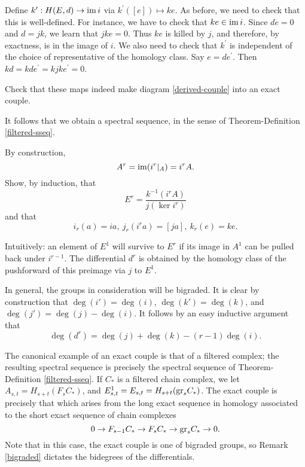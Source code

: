 Define $k^\prime:H(E,d) \to \operatorname{im} i$ via $k^\prime([e])\mapsto ke$. As before,
we need to check that this is well-defined. For instance, we have to check that
$ke\in\operatorname{im} i$. Since $de = 0$ and $d = jk$, we learn that $jke = 0$. Thus $ke$
is killed by $j$, and therefore, by exactness, is in the image of $i$. We also
need to check that $k^\prime$ is independent of the choice of representative of
the homology class. Say $e = de^\prime$. Then $kd = kd e^\prime = kjke^\prime =
0$.
\begin{exercise}
    Check that these maps indeed make diagram \eqref{derived-couple} into an
    exact couple.
\end{exercise}
It follows that we obtain a spectral sequence, in the sense of
Theorem-Definition \ref{filtered-sseq}.
\begin{exercise}\label{explicit-er}
    By construction,
    $$A^r = \operatorname{im}(i^{r}|_{A}) = i^{r} A.$$
    Show, by induction, that
    $$E^r = \frac{k^{-1}(i^{r}A)}{j(\ker i^{r})}$$
    and that
    \begin{equation*}
	i_r(a) = ia,\ j_r(i^r a) = [ja],\ k_r(e) = ke.
    \end{equation*}
\end{exercise}
Intuitively: an element of $E^1$ will survive to $E^r$ if its image in $A^1$
can be pulled back under $i^{r-1}$. The differential $d^r$ is obtained by
the homology class of the pushforward of this preimage via $j$ to $E^1$.
\begin{remark}\label{bigraded}
    In general, the groups in consideration will be bigraded. It is clear by
    construction that $\deg(i') = \deg(i)$, $\deg(k') = \deg(k)$, and $\deg(j')
    = \deg(j)-\deg(i)$. It follows by an easy inductive argument that
    $$\deg(d^r) = \deg(j)+\deg(k)-(r-1)\deg(i).$$
\end{remark}
The canonical example of an exact couple is that of a filtered complex; the
resulting spectral sequence is precisely the spectral sequence of
Theorem-Definition \ref{filtered-sseq}. If $C_\ast$ is a filtered chain
complex, we let $A_{s,t} = H_{s+t}(F_s C_\ast)$, and $E^1_{s,t} = E_{s,t} =
H_{s+t}(\mathrm{gr}_s C_\ast)$. The exact couple is precisely that which arises from
the long exact sequence in homology associated to the short exact sequence of
chain complexes
$$0\to F_{s-1} C_\ast\to F_s C_\ast \to \mathrm{gr}_s C_\ast\to 0.$$
Note that in this case, the exact couple is one of bigraded groups, so Remark
\ref{bigraded} dictates the bidegrees of the differentials.

